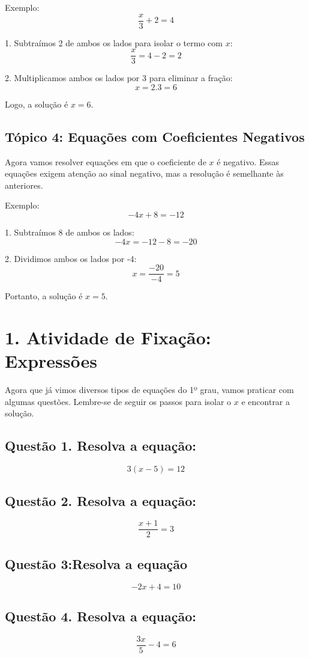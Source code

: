 \documentclass[11pt]{article}
\begin{document}
\begin{multicols}{2}
Exemplo:
\[
\frac{x}{3} + 2 = 4
\]

1. Subtraímos 2 de ambos os lados para isolar o termo com \(x\):
\[
\frac{x}{3} = 4 - 2 = 2
\]

2. Multiplicamos ambos os lados por 3 para eliminar a fração:
\[
x = 2 . 3 = 6
\]

Logo, a solução é \(x = 6\).

\subsection*{Tópico 4: Equações com Coeficientes Negativos}
Agora vamos resolver equações em que o coeficiente de \(x\) é negativo. Essas equações exigem atenção ao sinal negativo, mas a resolução é semelhante às anteriores.

Exemplo:
\[
-4x + 8 = -12
\]

1. Subtraímos 8 de ambos os lados:
\[
-4x = -12 - 8 = -20
\]

2. Dividimos ambos os lados por -4:
\[
x = \frac{-20}{-4} = 5
\]

Portanto, a solução é \(x = 5\).

\section*{1. Atividade de Fixação: Expressões}

Agora que já vimos diversos tipos de equações do 1º grau, vamos praticar com algumas questões. Lembre-se de seguir os passos para isolar o \(x\) e encontrar a solução.

\subsection*{Questão 1. Resolva a equação:}
\[
3(x - 5) = 12
\]

\subsection*{Questão 2. Resolva a equação:}
\[
\frac{x + 1}{2} = 3
\]

\subsection*{Questão 3:Resolva a equação}
\[
-2x + 4 = 10
\]

\subsection*{Questão 4. Resolva a equação:}
\[
\frac{3x}{5} - 4 = 6
\]


\end{multicols}
\end{document}

